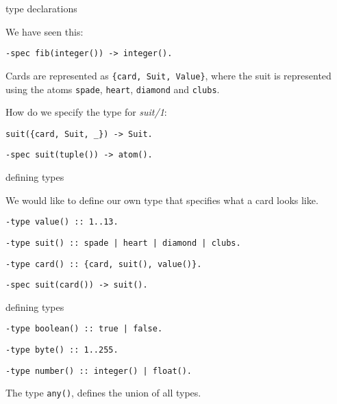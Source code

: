 \begin{frame}[fragile]{type declarations}

We have seen this:
\begin{verbatim}
-spec fib(integer()) -> integer().
\end{verbatim}

\pause\vspace{10pt}
Cards are represented as  {\tt \{card, Suit,
Value\}}, where the suit is represented using the atoms {\tt spade},
{\tt heart}, {\tt diamond} and {\tt clubs}.

\vspace{10pt}
How do we specify the type for {\em suit/1}:

\begin{verbatim}
suit({card, Suit, _}) -> Suit.
\end{verbatim}
\pause\vspace{10pt}
\begin{verbatim}
-spec suit(tuple()) -> atom().
\end{verbatim}

\end{frame}

\begin{frame}[fragile]{defining types}

We would like to define our own type that specifies what a card looks like.

\begin{verbatim}
-type value() :: 1..13.
\end{verbatim}
\pause

\begin{verbatim}
-type suit() :: spade | heart | diamond | clubs.
\end{verbatim}

\pause
\begin{verbatim}
-type card() :: {card, suit(), value()}.
\end{verbatim}

\pause
\begin{verbatim}
-spec suit(card()) -> suit().
\end{verbatim}

\end{frame}

\begin{frame}[fragile]{defining types}

\pause
\begin{verbatim}
-type boolean() :: true | false.
\end{verbatim}

\pause
\begin{verbatim}
-type byte() :: 1..255.
\end{verbatim}

\pause
\begin{verbatim}
-type number() :: integer() | float().
\end{verbatim}
\pause
The type {\tt any()}, defines the union of all types.

\end{frame}


